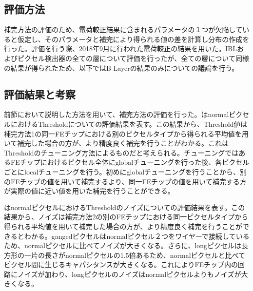 \subsection{評価方法}
補完方法の評価のため、電荷較正結果に含まれるパラメータの１つが欠陥していると仮定し、そのパラメータと補完により得られる値の差を計算し分布の作成を行った。評価を行う際、2018年9月に行われた電荷較正の結果を用いた。IBLおよびピクセル検出器の全ての層について評価を行ったが、全ての層について同様の結果が得られたため、以下ではB-Layerの結果のみについての議論を行う。

\subsection{評価結果と考察}

前節において説明した方法を用いて、補完方法の評価を行った。はnormalピクセルにおけるThresholdについての評価結果を表す。この結果から、Threshold値は補完方法1の同一FEチップにおける別のピクセルタイプから得られる平均値を用いて補完した場合の方が、より精度良く補完を行うことがわかる。これはThresholdのチューニング方法によるものだと考えられる。チューニングではあるFEチップにおけるピクセル全体にglobalチューニングを行った後、各ピクセルごとにlocalチューニングを行う。初めにglobalチューニングを行うことから、別のFEチップの値を用いて補完するより、同一FEチップの値を用いて補完する方が実際の値に近い値を用いた補完を行うことができる。

はnormalピクセルにおけるThresholdのノイズについての評価結果を表す。この結果から、ノイズは補完方法2の別のFEチップにおける同一ピクセルタイプから得られる平均値を用いて補完した場合の方が、より精度良く補完を行うことができるとわかる。gangedピクセルはnormalピクセル２つをワイヤーで接続しているため、normalピクセルに比べてノイズが大きくなる。さらに、longピクセルは長方形の一片の長さがnormalピクセルの1.5倍あるため、normalピクセルと比べてピクセル間に生じるキャパシタンスが大きくなる。これによりFEチップ内の回路にノイズが加わり、longピクセルのノイズはnormalピクセルよりもノイズが大きくなる。


